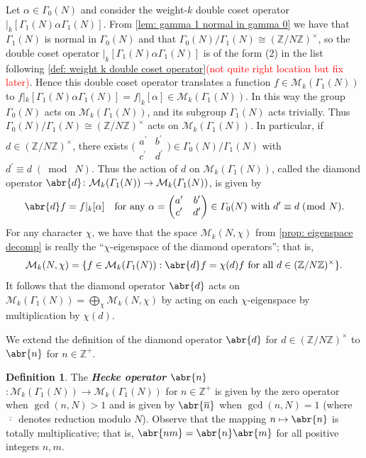 \documentclass[10pt,leqno,twoside,b5paper]{article}
\theoremstyle{plain}
\theoremstyle{definition}
\newtheorem{definition/}[lem]{Definition}
\newenvironment{definition}
  {\renewcommand{\qedsymbol}{\textdagger}%
   \pushQED{\qed}\begin{definition/}}
  {\popQED\end{definition/}}
\numberwithin{equation}{section}
\numberwithin{lem}{section}
\newcommand{\textib}[1]{\textbf{\textit{#1\index{#1}}}} %
\newcommand{\smod}[1]{\;(\bmod\; #1)}
\newcommand{\sai}[1]{\textcolor{red}{#1}}
\begin{document}
Let $\alpha\in\varGamma_0(N)$ and consider the weight-$k$ double coset operator $|_k[\varGamma_1(N)\alpha\varGamma_1(N)]$. From \cref{lem: gamma 1 normal in gamma 0} we have that $\varGamma_1(N)$ is normal in $\varGamma_0(N)$ and that $\varGamma_0(N)/\varGamma_1(N)\cong (\mathbb Z/N\mathbb Z)^\times$, so the double coset operator $|_k[\varGamma_1(N)\alpha\varGamma_1(N)]$ is of the form (2) in the list following \cref{def: weight k double coset operator}\sai{(not quite right location but fix later)}. Hence this double coset operator translates a function $f\in \mathcal M_k(\varGamma_1(N))$ to $f|_k[\varGamma_1(N)\alpha\varGamma_1(N)] = f|_k[\alpha]\in \mathcal M_k(\varGamma_1(N))$. In this way the group $\varGamma_0(N)$ acts on $\mathcal M_k(\varGamma_1(N))$, and its subgroup $\varGamma_1(N)$ acts trivially. Thus $\varGamma_0(N)/\varGamma_1(N)\cong (\mathbb Z/N\mathbb Z)^\times$ acts on $\mathcal M_k(\varGamma_1(N))$. In particular, if $d\in (\mathbb Z/N\mathbb Z)^\times$, there exists $\big(\!\begin{smallmatrix}
    a^\prime & b^\prime \\ c^\prime & d^\prime
\end{smallmatrix}\!\big)\in \varGamma_0(N)/\varGamma_1(N)$ with $d^\prime\equiv d\smod N$. Thus the action of $d$ on $\mathcal M_k(\varGamma_1(N))$, called the diamond operator $\abr{d}\colon \mathcal M_k(\varGamma_1(N))\to \mathcal M_k(\varGamma_1(N))$, is given by 
\[\abr{d}f = f|_k[\alpha] \quad \text{for any $\alpha = \begin{pmatrix}
    a^\prime & b^\prime \\ c^\prime & d^\prime
\end{pmatrix}\in \varGamma_0(N)$ with $d^\prime\equiv d\smod N$}.\]
For any character $\chi$, we have that the space $\mathcal M_k(N,\chi)$ from \cref{prop: eigenspace decomp} is really the ``$\chi$-eigenspace of the diamond operators''; that is,
\[\mathcal M_k(N,\chi) = \{f\in \mathcal M_k(\varGamma_1(N)) : \abr{d}f = \chi(d)f \text{ for all } d\in(\mathbb Z/N\mathbb Z)^\times\}.\] 
It follows that the diamond operator $\abr{d}$ acts on $\mathcal M_k(\varGamma_1(N)) = \bigoplus_\chi\mathcal M_k(N,\chi)$ by acting on each $\chi$-eigenspace by multiplication by $\chi(d)$.

We extend the definition of the diamond operator $\abr{d}$ for $d\in (\mathbb Z/N\mathbb Z)^\times$ to $\abr{n}$ for $n\in\mathbb{Z}^+$.
\begin{definition}
    The \textib{Hecke operator $\abr{n}$}$\colon \mathcal M_k(\varGamma_1(N))\to \mathcal M_k(\varGamma_1(N))$ for $n\in\mathbb{Z}^+$ is given by the zero operator when $\gcd(n,N)>1$ and is given by $\abr{\overline n}$ when $\gcd(n,N) = 1$ (where $\overline{\,\cdot\,}$ denotes reduction modulo $N$). Observe that the mapping $n\mapsto \abr{n}$ is totally multiplicative; that is, $\abr{nm} = \abr{n}\abr{m}$ for all positive integers $n,m$.
\end{definition}
\end{document}

